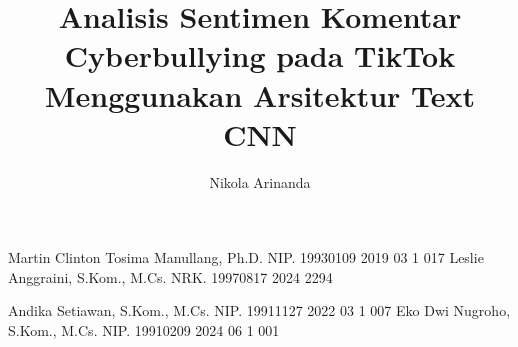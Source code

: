 \documentclass[article]{report} %
\begin{document}

    
    \title{Analisis Sentimen Komentar Cyberbullying pada TikTok Menggunakan Arsitektur Text CNN} %
    
    \author{Nikola Arinanda}		%
	
	\dosbingA%
		{Martin Clinton Tosima Manullang, Ph.D.}%
		{NIP. 19930109 2019 03 1 017}				%
	\dosbingB%
		{Leslie Anggraini, S.Kom., M.Cs.}%
		{NRK. 19970817 2024 2294}				%
		
	\pengujiA%
		{Andika Setiawan, S.Kom., M.Cs.}%
		{NIP. 19911127 2022 03 1 007}				%
	\pengujiB%
		{Eko Dwi Nugroho, S.Kom., M.Cs.}%
		{NIP. 19910209 2024 06 1 001}				%

	\sloppy %
    \setcounter{page}{1} %

    \clearpage
    \pagestyle{alternatingstyle}
    
%    
%   

    \tableofcontents
    \pagebreak
    \listoftables
    \pagebreak
    \listoffigures
    \pagebreak
    \listofmyequations
%    
    \lstlistoflistings
    \pagebreak
    
\end{document}
